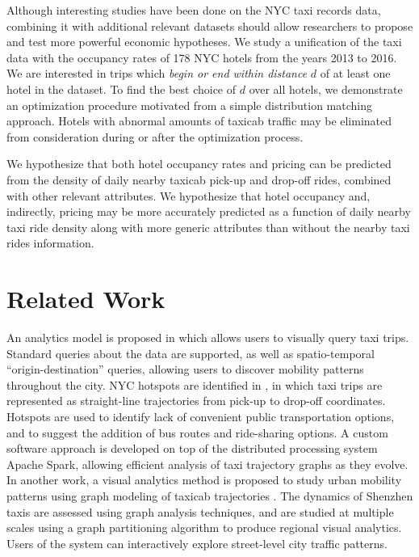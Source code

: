 \documentclass[useAMS, usenatbib]{biom}
\begin{document}
Although interesting studies have been done on the NYC taxi records data, combining it with additional relevant datasets should allow researchers to propose and test more powerful economic hypotheses. We study a unification of the taxi data with the occupancy rates of 178 NYC hotels from the years 2013 to 2016. We are interested in trips which \textit{begin or end within distance} $d$ of at least one hotel in the dataset. To find the best choice of $d$ over all hotels, we demonstrate an optimization procedure motivated from a simple distribution matching approach. Hotels with abnormal amounts of taxicab traffic may be eliminated from consideration during or after the optimization process.

We hypothesize that both hotel occupancy rates and pricing can be predicted from the density of daily nearby taxicab pick-up and drop-off rides, combined with other relevant attributes. We hypothesize that hotel occupancy and, indirectly, pricing may be more accurately predicted as a function of daily nearby taxi ride density along with more generic attributes than without the nearby taxi rides information.

\section{Related Work}
\label{s:related}

An analytics model is proposed in \citet{Ferreira2013VisualEO} which allows users to visually query taxi trips. Standard queries about the data are supported, as well as spatio-temporal ``origin-destination'' queries, allowing users to discover mobility patterns throughout the city. NYC hotspots are identified in \citet{Stoyanovich2017ZoomingIO}, in which taxi trips are represented as straight-line trajectories from pick-up to drop-off coordinates. Hotspots are used to identify lack of convenient public transportation options, and to suggest the addition of bus routes and ride-sharing options. A custom software approach is developed on top of the distributed processing system Apache Spark, allowing efficient analysis of taxi trajectory graphs as they evolve. In another work, a visual analytics method is proposed to study urban mobility patterns using graph modeling of taxicab trajectories \citep{Huang2016TrajGraphAG}. The dynamics of Shenzhen taxis are assessed using graph analysis techniques, and are studied at multiple scales using a graph partitioning algorithm to produce regional visual analytics. Users of the system can interactively explore street-level city traffic patterns. 
\end{document}
